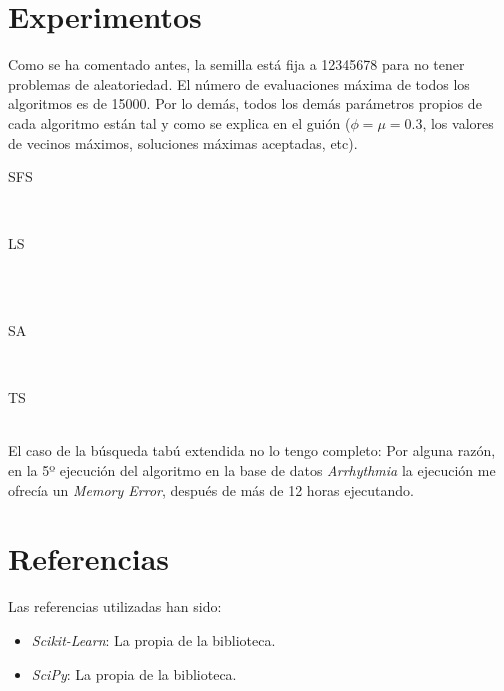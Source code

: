 \documentclass[a4paper, 11pt]{article}
\begin{document}
  \section{Experimentos}
    Como se ha comentado antes, la semilla está fija a 12345678 para no tener problemas de aleatoriedad. El número de evaluaciones máxima de todos los algoritmos es de 15000. Por lo demás, todos los demás parámetros propios de cada algoritmo están tal y como se explica en el guión ($\phi=\mu=0.3$, los valores de vecinos máximos, soluciones máximas aceptadas, etc). \\

    \centerline{SFS}
    
    \\ \centerline{LS}
    \\
    \\ \centerline{SA}
    
    \\ \centerline{TS}
     \\

    El caso de la búsqueda tabú extendida no lo tengo completo: Por alguna razón, en la 5º ejecución del algoritmo en la base de datos \emph{Arrhythmia} la ejecución me ofrecía un \emph{Memory Error}, después de más de 12 horas ejecutando.

  \section{Referencias}

  Las referencias utilizadas han sido:
  \begin{itemize}
    \item \emph{Scikit-Learn}: La propia  de la biblioteca.
    \item \emph{SciPy}: La propia  de la biblioteca.
  \end{itemize}
\end{document}
